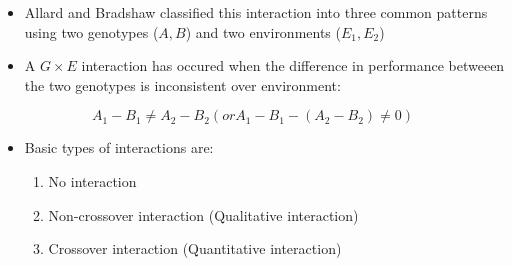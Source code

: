 \documentclass[11pt,dvipsnames,ignorenonframetext,aspectratio=169]{beamer}
\providecommand{\tightlist}{%
  \setlength{\itemsep}{0pt}\setlength{\parskip}{0pt}}
\begin{document}
\begin{frame}{}
\protect\hypertarget{section-1}{}
\begin{itemize}
\tightlist
\item
  Allard and Bradshaw classified this interaction into three common
  patterns using two genotypes (\(A, B\)) and two environments
  (\(E_1, E_2\))
\item
  A \(G \times E\) interaction has occured when the difference in
  performance betweeen the two genotypes is inconsistent over
  environment:
\end{itemize}

\[
A_1 - B_1 \neq A_2 - B_2 (or A_1-B_1 - (A_2-B_2) \neq 0)
\]
\end{frame}

\begin{frame}{}
\protect\hypertarget{section-2}{}
\begin{itemize}
\tightlist
\item
  Basic types of interactions are:

  \begin{enumerate}
  \tightlist
  \item
    No interaction
  \item
    Non-crossover interaction (Qualitative interaction)
  \item
    Crossover interaction (Quantitative interaction)
  \end{enumerate}
\end{itemize}
\end{frame}
\end{document}
